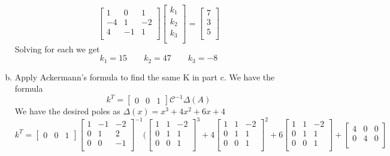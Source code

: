 \documentclass{article}
\begin{document}
\begin{enumerate}[a.]
$$\begin{bmatrix}
1 & 0 & 1 \\
-4 & 1 & -2 \\
4 & -1 & 1\\
\end{bmatrix}
\begin{bmatrix}
k_1\\
k_2\\
k_3\\
\end{bmatrix}
=
\begin{bmatrix}
7\\
3\\
5\\
\end{bmatrix}
$$
Solving for each we get
$$ k_1 = 15 \qquad k_2 = 47 \qquad k_3 = -8 $$

\item Apply Ackermann's formula to find the same K in part c.
\newline
We have the formula
$$ k^T = \begin{bmatrix}0 & 0 & 1 \end{bmatrix} \mathcal{C}^{-1} \Delta (A) $$
We have the desired poles as $ \Delta (x) = x^3 + 4x^2 + 6x + 4 $
$$ k^T =
\begin{bmatrix} 0 & 0 & 1 \end{bmatrix}
\begin{bmatrix}
1 & -1 & -2 \\
0 & 1 & 2   \\
0 & 0 & -1  \\
\end{bmatrix}
^{-1}
(
\begin{bmatrix}
1 & 1 & -2 \\
0 & 1 &  1 \\
0 & 0 &  1 \\
\end{bmatrix}
^3
+
4
\begin{bmatrix}
1 & 1 & -2 \\
0 & 1 &  1 \\
0 & 0 &  1 \\
\end{bmatrix}
^2
+
6
\begin{bmatrix}
1 & 1 & -2 \\
0 & 1 &  1 \\
0 & 0 &  1 \\
\end{bmatrix}
+
\begin{bmatrix}
4 & 0 & 0 \\
0 & 4 & 0 \\

\end{bmatrix}$$
\end{enumerate}
\end{document}
